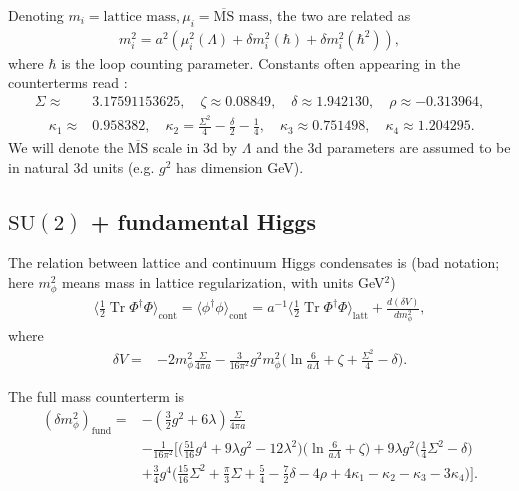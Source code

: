\documentclass[11pt,a4paper]{article}
\newcommand\Tr{\operatorname{Tr}}
\newcommand\MSbar{$\overline{\text{MS}}$ } %
\newcommand\he[1]{#1^\dagger}%
\newcommand\gr[1]{\mathrm{#1}}%
\newcommand\lauri[1]{{\color{myorange}#1}}
\begin{document}
Denoting $m_i = \text{lattice mass}, \mu_i = \text{\MSbar mass}$, the two are related as 
\begin{align}
m^2_i = a^2 (\mu^2_i(\Lambda) + \delta m^2_i(\hbar) + \delta m^2_i(\hbar^2) ),
\end{align}
where $\hbar$ is the loop counting parameter. Constants often appearing in the counterterms read \cite{Laine:1997dy}: 
\begin{align}
\Sigma \approx& 3.17591153625, \quad \zeta \approx 0.08849, \quad \delta \approx 1.942130, \quad \rho \approx -0.313964, \nonumber \\ 
\quad \kappa_1 \approx& 0.958382, \quad \kappa_2 = \frac{\Sigma^2}{4} - \frac{\delta}{2} - \frac14, \quad \kappa_3 \approx 0.751498, \quad \kappa_4 \approx 1.204295.
\end{align}
We will denote the \MSbar scale in 3d by $\Lambda$ and the 3d parameters are assumed to be in natural 3d units (e.g. $g^2$ has dimension GeV).

\subsection{$\gr{SU(2)}$ + fundamental Higgs}

The relation between lattice and continuum Higgs condensates is \lauri{(bad notation; here $m^2_\phi$ means mass in lattice regularization, with units GeV$^2$)}
\begin{align}
\langle \frac12\Tr\he\Phi\Phi\rangle_\text{cont} = \langle\phi^\dagger\phi\rangle_\text{cont} = a^{-1}\langle \frac12\Tr\he\Phi\Phi\rangle_\text{latt} + \frac{d(\delta V)}{dm^2_\phi}, 
\end{align}
where 
\begin{align}
\label{eq:vacuumCT_higgs}
\delta V =& - 2 m^2_\phi \frac{\Sigma}{4\pi a} - \frac{3}{16\pi^2} g^2 m^2_\phi \Big( \ln \frac{6}{a \Lambda} +\zeta + \frac{\Sigma^2}{4} - \delta \Big).
\end{align}

The full mass counterterm is
\begin{align}
(\delta m^2_\phi)_\text{fund} =& -(\frac32 g^2 + 6\lambda) \frac{\Sigma}{4\pi a} \nonumber \\
&- \frac{1}{16\pi^2}\Big[ \Big( \frac{51}{16}g^4 + 9\lambda g^2 - 12\lambda^2 \Big)\Big( \ln \frac{6}{a\Lambda}+\zeta \Big)
 + 9\lambda g^2 \Big( \frac14 \Sigma^2 - \delta \Big) \nonumber \\ 
& + \frac34 g^4 \Big( \frac{15}{16}\Sigma^2 + \frac{\pi}{3} \Sigma + \frac54 - \frac72 \delta - 4\rho +4\kappa_1 - \kappa_2 - \kappa_3 - 3\kappa_4  \Big) \Big].
\end{align}
\end{document}
